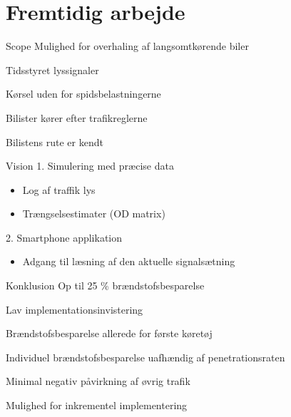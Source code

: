 \section{Fremtidig arbejde}
\begin{frame}{Scope}
Mulighed for overhaling af langsomtkørende biler
\vspace{4mm}

Tidsstyret lyssignaler
\vspace{4mm}

Kørsel uden for spidsbelastningerne
\vspace{4mm}

Bilister kører efter trafikreglerne

\vspace{4mm}
Bilistens rute er kendt

\end{frame}

\begin{frame}{Vision}
1. Simulering med præcise data
	\begin{itemize}
	\item Log af traffik lys
	\item Trængselsestimater (OD matrix)
	\end{itemize}

2. Smartphone applikation
	\begin{itemize}
	\item Adgang til læsning af den aktuelle signalsætning
	\end{itemize}

\end{frame}

\begin{frame}{Konklusion}
Op til 25 \% brændstofsbesparelse
\vspace{4mm}

Lav implementationsinvistering
\vspace{4mm}

Brændstofsbesparelse allerede for første køretøj
\vspace{4mm}

Individuel brændstofsbesparelse uafhændig af penetrationsraten
\vspace{4mm}

Minimal negativ påvirkning af øvrig trafik
\vspace{4mm}


Mulighed for inkrementel implementering
\end{frame}

